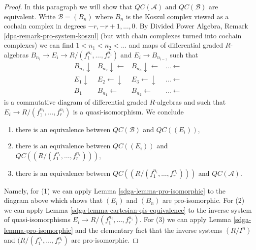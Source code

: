 \begin{proof}
\medskip\noindent
In this paragraph we will show that $\mathit{QC}(\mathcal{A})$ and
$\mathit{QC}(\mathcal{B})$ are equivalent.
Write $\mathcal{B} = (B_n)$ where $B_n$ is the Koszul complex
viewed as a cochain complex in degrees $-r, -r + 1, \ldots, 0$.
By Divided Power Algebra, Remark \ref{dpa-remark-pro-system-koszul}
(but with chain complexes
turned into cochain complexes)
we can find $1 < n_1 < n_2 < \ldots$
and maps of differential graded $R$-algebras
$B_{n_i} \to E_i \to R/(f_1^{n_i}, \ldots, f_r^{n_i})$
and $E_i \to B_{n_{i - 1}}$ such that
$$
\begin{array}{cccc}B_{n_1} \downarrow & B_{n_2} \downarrow\longleftarrow & B_{n_3} \downarrow\longleftarrow & \ldots \longleftarrow \\ E_1 \downarrow & E_2 \longleftarrow\downarrow & E_3 \longleftarrow\downarrow & \ldots \longleftarrow \\ B_1 & B_{n_1} \longleftarrow & B_{n_2} \longleftarrow & \ldots \longleftarrow\end{array}
$$
is a commutative diagram of differential graded $R$-algebras
and such that $E_i \to R/(f_1^{n_i}, \ldots, f_r^{n_i})$ is
a quasi-isomorphism. We conclude
\begin{enumerate}
\item there is an equivalence between $\mathit{QC}(\mathcal{B})$ and
$\mathit{QC}((E_i))$,
\item there is an equivalence between
$\mathit{QC}((E_i))$ and $\mathit{QC}((R/(f_1^{n_i}, \ldots, f_r^{n_i})))$,
\item there is an equivalence between
$\mathit{QC}((R/(f_1^{n_i}, \ldots, f_r^{n_i})))$ and
$\mathit{QC}(\mathcal{A})$.
\end{enumerate}
Namely, for (1) we can apply Lemma \ref{sdga-lemma-pro-isomorphic}
to the diagram above which shows that $(E_i)$ and $(B_n)$ are pro-isomorphic.
For (2) we can apply  Lemma \ref{sdga-lemma-cartesian-qis-equivalence} to the
inverse system of quasi-isomorphisms $E_i \to R/(f_1^{n_i}, \ldots, f_r^{n_i})$.
For (3) we can apply Lemma \ref{sdga-lemma-pro-isomorphic}
and the elementary fact that the inverse systems $(R/I^n)$ and
$(R/(f_1^{n_i}, \ldots, f_r^{n_i})$ are pro-isomorphic.


\end{proof}
